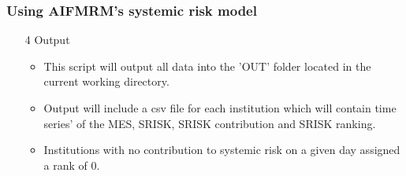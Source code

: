 \documentclass[11pt]{beamer}
\begin{document}
\begin{frame}
\frametitle{Using AIFMRM's systemic risk model}
\begin{enumerate}
\item[4] Output
\begin{itemize}
\item This script will output all data into the 'OUT' folder located in the current working directory.
\item Output will include a csv file for each institution which will contain time series' of the MES, SRISK, SRISK contribution and SRISK ranking.
\item Institutions with no contribution to systemic risk on a given day assigned a rank of 0.
\end{itemize}
\end{enumerate}
\end{frame}










\begin{frame}
\begin{center}
\end{center}
\end{frame}
\end{document}
